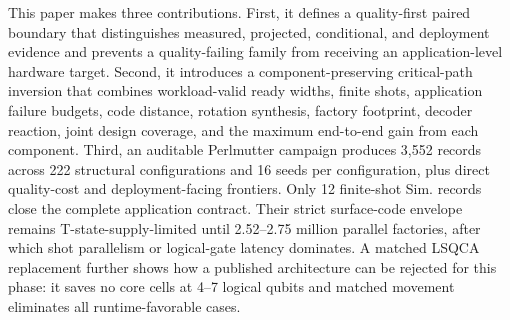 This paper makes three contributions. First, it defines a quality-first paired boundary that distinguishes measured, projected, conditional, and deployment evidence and prevents a quality-failing family from receiving an application-level hardware target. Second, it introduces a component-preserving critical-path inversion that combines workload-valid ready widths, finite shots, application failure budgets, code distance, rotation synthesis, factory footprint, decoder reaction, joint design coverage, and the maximum end-to-end gain from each component. Third, an auditable Perlmutter campaign produces 3,552 records across 222 structural configurations and 16 seeds per configuration, plus direct quality-cost and deployment-facing frontiers. Only 12 finite-shot Sim. records close the complete application contract. Their strict surface-code envelope remains T-state-supply-limited until 2.52--2.75 million parallel factories, after which shot parallelism or logical-gate latency dominates. A matched LSQCA replacement further shows how a published architecture can be rejected for this phase: it saves no core cells at 4--7 logical qubits and matched movement eliminates all runtime-favorable cases.
